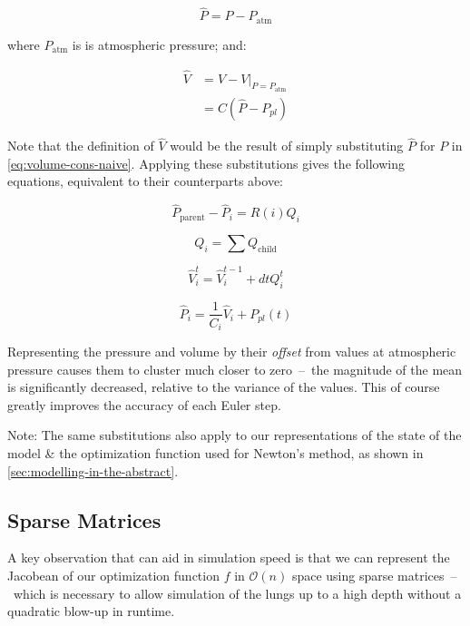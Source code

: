 \begin{equation}
    \hat{P} = P - P_{\text{atm}}
\end{equation}

\noindent
where $P_{\text{atm}}$ is is atmospheric pressure; and:

\begin{align}
    \hat{V} & = V - V \vert_{P = P_{\text{atm}}} \\
            & = C (\hat{P} - P_{pl})
\end{align}

\noindent
Note that the definition of $\hat{V}$ would be the result of simply substituting $\hat{P}$ for $P$
in \ref{eq:volume-cons-naive}. Applying these substitutions gives the following
equations, equivalent to their counterparts above:

\begin{equation}
    \hat{P}_{\text{parent}} - \hat{P}_i = R(i) Q_i
\end{equation}

\begin{equation}
    Q_i = \sum Q_{\text{child}}
\end{equation}

\begin{equation}
    \hat{V}_i^t = \hat{V}_i^{t-1} + dt Q_i^t
\end{equation}

\begin{equation}
    \hat{P}_i = \frac{1}{C_i} \hat{V}_i + P_{pl}(t)
\end{equation}

Representing the pressure and volume by their \textit{offset} from values at atmospheric pressure
causes them to cluster much closer to zero~--~the magnitude of the mean is significantly decreased,
relative to the variance of the values. This of course greatly improves the accuracy of each Euler
step.

Note: The same substitutions also apply to our representations of the state of the model \& the
optimization function used for Newton's method, as shown in \autoref{sec:modelling-in-the-abstract}.

\subsection{Sparse Matrices}

A key observation that can aid in simulation speed is that we can represent the Jacobean of our
optimization function $f$ in $\mathcal{O}(n)$ space using sparse matrices~--~which is necessary to
allow simulation of the lungs up to a high depth without a quadratic blow-up in runtime.

